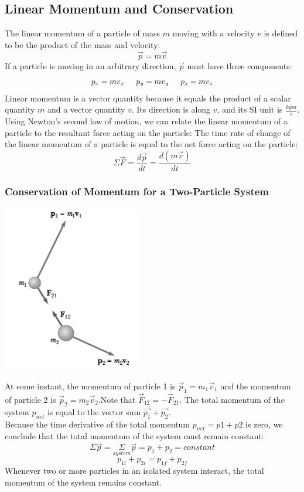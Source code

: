 \documentclass{article}
\begin{document}
	\subsection{Linear Momentum and Conservation}
    	The linear momentum of a particle of mass $m$ moving with a velocity $v$ is defined to be the product of the mass and velocity:
        \[
        	\vec{p}=m\vec{v}
        \]
        If a particle is moving in an arbitrary direction, $\vec{p}$ must have three components:
        \[
        	p_x=mv_x \indent
            p_y=mv_y \indent
            p_z=mv_z
        \]
        Linear momentum is a vector quantity because it equals the product of a scalar quantity $m$ and a vector quantity $v$. Its direction is along $v$, and its SI unit is $\frac{kgm}{s}$. Using Newton’s second law of motion, we can relate the linear momentum of a particle to the resultant force acting on the particle: The time rate of change of the linear momentum of a particle is equal to the net force acting on the particle:
        \[
        	\Sigma\vec{F}=\frac{d\vec{p}}{dt}=\frac{d(m\vec{v})}{dt}
        \]
		\subsubsection{Conservation of Momentum for a Two-Particle System}
        	\begin{multicols}{2}
            	\centerline{\includegraphics[width=6cm]{conMomentum.png}}
            \columnbreak
            	At some instant, the momentum of particle 1 is $\vec{p}_1=m_1\vec{v}_1$ and the momentum of particle 2 is $\vec{p}_2=m_2\vec{v}_2$.Note that $\vec{F}_{12}=-\vec{F}_{21}$. The total momentum of the system $p_{net}$ is equal to the vector sum $\vec{p_1}+\vec{p_2}$.\\
            	Because the time derivative of the total momentum $p_{net}=p1+p2$ is zero, we conclude that the total momentum of the system must remain constant:
            	\[
            		\Sigma\vec{p}=\underset{system}{\Sigma}\vec{p}=p_1+p_2=constant
            	\]
            	\[
            		p_{1i}+p_{2i}=p_{1f}+p_{2f}
            	\]
            	Whenever two or more particles in an isolated system interact, the total momentum of the system remains constant.
            \end{multicols}
\end{document}
